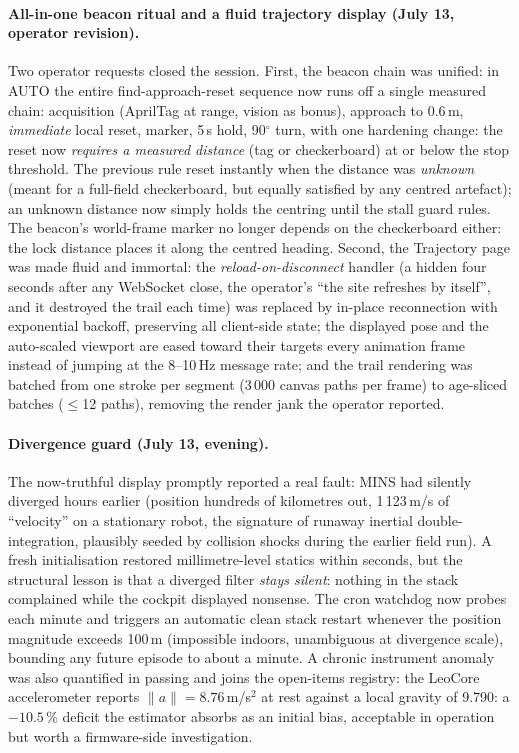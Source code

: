 \paragraph{All-in-one beacon ritual and a fluid trajectory display
(July 13, operator revision).} Two operator requests closed the session.
First, the beacon chain was unified: in AUTO the entire
find-approach-reset sequence now runs off a single measured chain:
acquisition (AprilTag at range, vision as bonus), approach to 0.6\,m,
\emph{immediate} local reset, marker, 5\,s hold, 90$^\circ$ turn,
with one hardening change: the reset now \emph{requires a measured
distance} (tag or checkerboard) at or below the stop threshold. The
previous rule reset instantly when the distance was \emph{unknown}
(meant for a full-field checkerboard, but equally satisfied by any
centred artefact); an unknown distance now simply holds the centring
until the stall guard rules. The beacon's world-frame marker no longer
depends on the checkerboard either: the lock distance places it along
the centred heading. Second, the Trajectory page was made fluid and
immortal: the \emph{reload-on-disconnect} handler (a hidden
 four seconds after any WebSocket close, the
operator's ``the site refreshes by itself'', and it destroyed the trail
each time) was replaced by in-place reconnection with exponential
backoff, preserving all client-side state; the displayed pose and the
auto-scaled viewport are eased toward their targets every animation
frame instead of jumping at the 8--10\,Hz message rate; and the trail
rendering was batched from one stroke per segment (3\,000 canvas paths
per frame) to age-sliced batches ($\leq$12 paths), removing the render
jank the operator reported.

\paragraph{Divergence guard (July 13, evening).} The now-truthful display
promptly reported a real fault: MINS had silently diverged hours earlier
(position hundreds of kilometres out, 1\,123\,m/s of ``velocity'' on a
stationary robot, the signature of runaway inertial double-integration,
plausibly seeded by collision shocks during the earlier field run). A fresh
initialisation restored millimetre-level statics within seconds, but the
structural lesson is that a diverged filter \emph{stays silent}: nothing in
the stack complained while the cockpit displayed nonsense. The cron watchdog
now probes  each minute and triggers an automatic
clean stack restart whenever the position magnitude exceeds 100\,m
(impossible indoors, unambiguous at divergence scale), bounding any future
episode to about a minute. A chronic instrument anomaly was also quantified
in passing and joins the open-items registry: the LeoCore accelerometer
reports $\lVert a \rVert = 8.76$\,m/s$^2$ at rest against a local gravity
of 9.790: a $-10.5\,\%$ deficit the estimator absorbs as an initial
bias, acceptable in operation but worth a firmware-side investigation.

